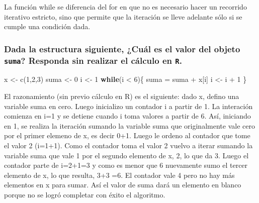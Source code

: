 \documentclass[
]{article}
\newenvironment{Shaded}{\begin{snugshade}}{\end{snugshade}}
\newcommand{\ControlFlowTok}[1]{\textcolor[rgb]{0.13,0.29,0.53}{\textbf{#1}}}
\newcommand{\DecValTok}[1]{\textcolor[rgb]{0.00,0.00,0.81}{#1}}
\newcommand{\FunctionTok}[1]{\textcolor[rgb]{0.00,0.00,0.00}{#1}}
\newcommand{\NormalTok}[1]{#1}
\newcommand{\OtherTok}[1]{\textcolor[rgb]{0.56,0.35,0.01}{#1}}
\newcommand{\SpecialCharTok}[1]{\textcolor[rgb]{0.00,0.00,0.00}{#1}}
\begin{document}
La función while se diferencia del for en que no es necesario hacer un
recorrido iterativo estricto, sino que permite que la iteración se lleve
adelante sólo si se cumple una condición dada.

\hypertarget{dada-la-estructura-siguiente-cuuxe1l-es-el-valor-del-objeto-suma-responda-sin-realizar-el-cuxe1lculo-en-r.}{%
\subsubsection{\texorpdfstring{Dada la estructura siguiente, ¿Cuál es el
valor del objeto \texttt{suma}? Responda sin realizar el cálculo en
\texttt{R}.}{Dada la estructura siguiente, ¿Cuál es el valor del objeto suma? Responda sin realizar el cálculo en R.}}\label{dada-la-estructura-siguiente-cuuxe1l-es-el-valor-del-objeto-suma-responda-sin-realizar-el-cuxe1lculo-en-r.}}

\begin{Shaded}
\begin{Highlighting}[]
\NormalTok{x }\OtherTok{\textless{}{-}} \FunctionTok{c}\NormalTok{(}\DecValTok{1}\NormalTok{,}\DecValTok{2}\NormalTok{,}\DecValTok{3}\NormalTok{)}
\NormalTok{suma }\OtherTok{\textless{}{-}} \DecValTok{0}
\NormalTok{i }\OtherTok{\textless{}{-}} \DecValTok{1}
\ControlFlowTok{while}\NormalTok{(i }\SpecialCharTok{\textless{}} \DecValTok{6}\NormalTok{)\{}
\NormalTok{ suma }\OtherTok{=}\NormalTok{ suma }\SpecialCharTok{+}\NormalTok{ x[i]      }
\NormalTok{ i }\OtherTok{\textless{}{-}}\NormalTok{ i }\SpecialCharTok{+} \DecValTok{1}     
\NormalTok{\}}
\end{Highlighting}
\end{Shaded}

El razonamiento (sin previo cálculo en R) es el siguiente: dado x,
defino una variable suma en cero. Luego inicializo un contador i a
partir de 1. La interación comienza en i=1 y se detiene cuando i toma
valores a partir de 6. Así, iniciando en 1, se realiza la iteración
sumando la variable suma que originalmente vale cero por el primer
elemeno de x, es decir 0+1. Luego le ordeno al contador que tome el
valor 2 (i=1+1). Como el contador toma el valor 2 vuelvo a iterar
sumando la variable suma que vale 1 por el segundo elemento de x, 2, lo
que da 3. Luego el contador parte de i=2+1=3 y como es menor que 6
nuevamente sumo el tercer elemento de x, lo que resulta, 3+3 =6. El
contador vale 4 pero no hay más elementos en x para sumar. Así el valor
de suma dará un elemento en blanco porque no se logró completar con
éxito el algoritmo.
\end{document}
